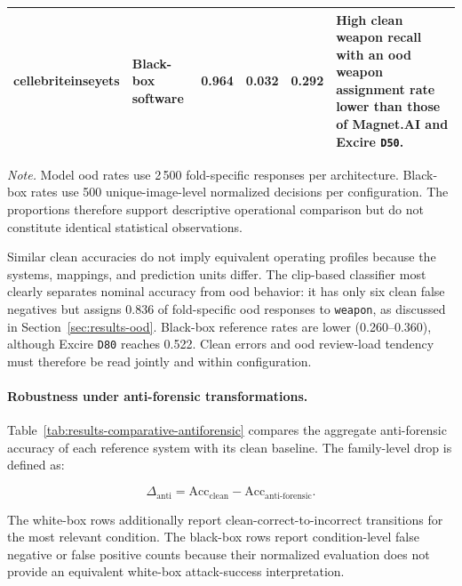 \begin{table}[!htbp]
\begin{tabularx}{\textwidth}{@{}
>{\raggedright\arraybackslash}p{2.35cm}
>{\raggedright\arraybackslash}p{1.45cm}
c c c
>{\raggedright\arraybackslash}X
@{}}
\gls{cellebriteinseyets}
& Black-box software
& 0.964
& 0.032
& 0.292
& High clean weapon recall with an \gls{ood} weapon assignment rate lower than
those of Magnet.AI and Excire \texttt{D50}. \\

\bottomrule
\end{tabularx}

\vspace{0.4em}
\footnotesize
\textit{Note.} Model \gls{ood} rates use 2\,500 fold-specific responses
per architecture. Black-box rates use 500 unique-image-level normalized
decisions per configuration. The proportions therefore support descriptive
operational comparison but do not constitute identical statistical
observations.
\end{table}

Similar clean accuracies do not imply equivalent operating profiles because the
systems, mappings, and prediction units differ. The \gls{clip}-based classifier most
clearly separates nominal accuracy from \gls{ood} behavior: it has only six
clean false negatives but assigns 0.836 of fold-specific \gls{ood} responses to
\texttt{weapon}, as discussed in Section~\ref{sec:results-ood}. Black-box
reference rates are lower (0.260--0.360), although
Excire \texttt{D80} reaches 0.522. Clean errors and \gls{ood} review-load
tendency must therefore be read jointly and within configuration.

\paragraph{Robustness under anti-forensic transformations.}

Table~\ref{tab:results-comparative-antiforensic} compares the aggregate
anti-forensic accuracy of each reference system with its clean baseline. The
family-level drop is defined as:

\begin{equation}
\Delta_{\mathrm{anti}}
=
\mathrm{Acc}_{\mathrm{clean}}
-
\mathrm{Acc}_{\mathrm{anti\mbox{-}forensic}}.
\end{equation}

The white-box rows additionally report clean-correct-to-incorrect transitions for
the most relevant condition. The black-box rows report condition-level false
negative or false positive counts because their normalized evaluation does not
provide an equivalent white-box attack-success interpretation.

